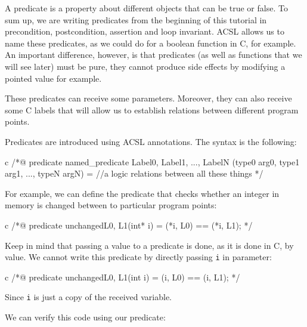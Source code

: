 A predicate is a property about different objects that can be true or
false. To sum up, we are writing predicates from the beginning of this
tutorial in precondition, postcondition, assertion and loop invariant.
ACSL allows us to name these predicates, as we could do for a boolean
function in C, for example. An important difference, however, is that
predicates (as well as functions that we will see later) must be pure,
they cannot produce side effects by modifying a pointed value for
example.

These predicates can receive some parameters. Moreover, they can also
receive some C labels that will allow us to establish relations between
different program points.





Predicates are introduced using ACSL annotations. The syntax is the
following:



\begin{CodeBlock}{c}
/*@
  predicate named_predicate { Label0, Label1, ..., LabelN }(type0 arg0, type1 arg1, ..., typeN argN) =
    //a logic relations between all these things
*/
\end{CodeBlock}



For example, we can define the predicate that checks whether an integer
in memory is changed between to particular program points:



\begin{CodeBlock}{c}
/*@
  predicate unchanged{L0, L1}(int* i) =
    \at(*i, L0) == \at(*i, L1);
*/
\end{CodeBlock}



\begin{Warning}
  Keep in mind that passing a value to a predicate is done, as it is done in C,
  by value. We cannot write this predicate by directly passing \texttt{i} in
  parameter:

\begin{CodeBlock}{c}
/*@
  predicate unchanged{L0, L1}(int i) =
    \at(i, L0) == \at(i, L1);
 */
\end{CodeBlock}

  Since \texttt{i} is just a copy of the received variable.
\end{Warning}


We can verify this code using our predicate:




